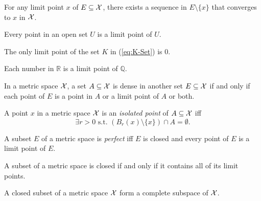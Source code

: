 \begin{lem}
  \label{lem:limitPointImpliesConvergence}
  For any limit point $x$ of $E\subseteq {\cal X}$,
  there exists a sequence in $E\setminus \{x\}$
  that converges to $x$ in ${\cal X}$.
\end{lem}

\begin{exm}
  Every point in an open set $U$ is a limit point of $U$. 
\end{exm}

\begin{exm}
  The only limit point of the set $K$ in (\ref{eq:K-Set}) is 0.
\end{exm}

\begin{exm}
  Each number in $\mathbb{R}$ 
   is a limit point of $\mathbb{Q}$.
\end{exm}

\begin{lem}
  \label{lem:denseSet}
  In a metric space ${\cal X}$,
  a set $A\subseteq {\cal X}$ is dense
  in another set $E\subseteq{\cal X}$
  if and only if %
  each point of $E$ is a point in $A$
  or a limit point of $A$ or both.
\end{lem}

\begin{defn}
  A point $x$ in a metric space ${\cal X}$
   is an \emph{isolated point} of $A\subseteq {\cal X}$ iff
  \begin{equation}
    \label{eq:isolatedPointMetricSpace}
    \exists r>0 \text{ s.t. } \left(B_r(x)\setminus\{x\}\right)\cap A
    = \emptyset. 
  \end{equation}
\end{defn}


\begin{defn}
  \label{def:perfectSets}
  A subset $E$ of a metric space is \emph{perfect}
  iff $E$ is closed and every point of $E$
  is a limit point of $E$.
\end{defn}


\begin{lem}
  \label{lem:closedSetsContainsAllLimitPoints}
  A subset of a metric space is closed
  if and only if it contains all of its limit points.
\end{lem}

\begin{coro}
  \label{coro:closedSubsetIsComplete}
  A closed subset of a metric space ${\cal X}$
  form a complete subspace of ${\cal X}$.
\end{coro}

